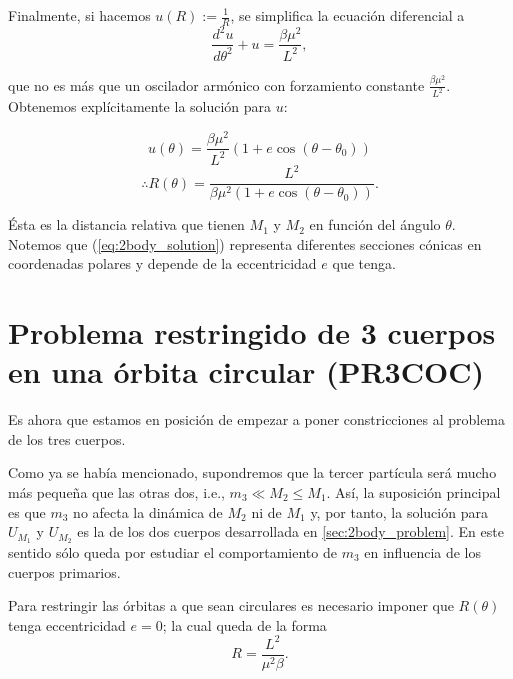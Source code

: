 Finalmente, si hacemos $u(R) := \frac{1}{R}$, se simplifica la ecuación diferencial a
\begin{equation}
 \frac{d^2u}{d\theta^2} + u = \frac{\beta \mu^2}{L^2},
\end{equation}

que no es más que un oscilador armónico con forzamiento constante $\frac{\beta \mu^2}{L^2}$. Obtenemos explícitamente la solución para $u$:

\begin{equation*}
 u(\theta) = \frac{\beta \mu^2}{L^2} \left( 1 + e \cos (\theta - \theta_0 ) \right) 
\end{equation*}
\begin{equation}
 \therefore R(\theta) = \frac{L^2}{\beta \mu^2 \left(1 + e \cos (\theta - \theta_0) \right)}.
 \label{eq:2body_solution}
\end{equation}


Ésta es la distancia relativa que tienen $M_1$ y $M_2$ en función del ángulo $\theta$. Notemos que (\ref{eq:2body_solution}) representa diferentes secciones cónicas en coordenadas polares y depende de la eccentricidad $e$ que tenga. 

\section{Problema restringido de 3 cuerpos en una órbita circular (PR3COC)}

Es ahora que estamos en posición de empezar a poner constricciones al problema de los tres cuerpos. 

Como ya se había mencionado, supondremos que la tercer partícula será mucho más pequeña que las otras dos, i.e., $m_3 \ll M_2 \leq M_1$. Así, la suposición principal es que $m_3$ no afecta la dinámica de $M_2$ ni de $M_1$ y, por tanto, la solución para $U_{M_1}$ y $U_{M_2}$ es la de los dos cuerpos desarrollada en \ref{sec:2body_problem}. En este sentido sólo queda por estudiar el comportamiento de $m_3$ en influencia de los cuerpos primarios.

Para restringir las órbitas a que sean circulares es necesario imponer que $R(\theta)$ tenga eccentricidad $e=0$; la cual queda de la forma
\begin{equation}
 R = \frac{L^2}{\mu^2 \beta}.
 \label{eq:3body_restricted_solution}
\end{equation} 

